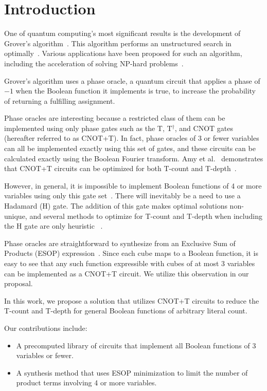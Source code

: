 \section{Introduction}
One of quantum computing's most significant results is the development of Grover's
algorithm~\cite{bib-grover1996fast}. This algorithm performs an unstructured search
in optimally~\cite{bib-zaika-grov-opt}. Various applications have
been proposed for such an algorithm, including the acceleration of solving NP-hard
problems~\cite{bib-williams-grover-np}.

Grover's algorithm uses a phase oracle, a quantum circuit that applies a phase of
$-1$ when the Boolean function it implements is true, to increase the probability
of returning a fulfilling assignment.

Phase oracles are interesting because a restricted class of them can be implemented
using only phase gates such as the T, T$^\dagger$, and CNOT gates (hereafter
referred to as CNOT+T). In fact, phase oracles of 3 or fewer variables can all be
implemented exactly using this set of gates, and these circuits can be calculated
exactly using the Boolean Fourier transform. Amy et al.~\cite{amy-meet-in-middle}
demonstrates that CNOT+T circuits can be optimized for both T-count and
T-depth~\cite{bib-amy-matroid}.

However, in general, it is impossible to implement Boolean functions of 4 or more
variables using only this gate set~\cite{bib-amy-rm}. There will inevitably be a need to use
a Hadamard (H) gate. The addition of this gate makes optimal solutions non-unique,
and several methods to optimize for T-count and T-depth when including the H gate
are only heuristic ~\cite{amy-meet-in-middle,bib-amy-matroid,bib-amy-rm}.

Phase oracles are straightforward to synthesize from an Exclusive Sum
of Products (ESOP) expression~\cite{bib-phaseoracle}. Since each cube maps to
a Boolean function, it is easy to see that any such function expressible with
cubes of at most 3 variables can be implemented as a CNOT+T circuit. We utilize
this observation in our proposal.

In this work, we propose a solution that utilizes CNOT+T circuits to reduce the
T-count and T-depth for general Boolean functions of arbitrary literal count.

Our contributions include:

\begin{itemize}
\item A precomputed library of circuits that implement all Boolean functions of
  3 variables or fewer.
\item A synthesis method that uses ESOP minimization to limit the number of
  product terms involving 4 or more variables.
\end{itemize}


